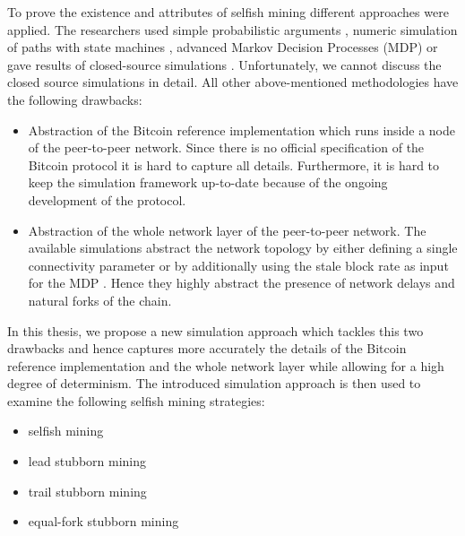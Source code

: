 To prove the existence and attributes of selfish mining different approaches were applied.
The researchers used simple probabilistic arguments \cite{eyal2014majority, bahack2013theoretical}, numeric simulation of paths with state machines \cite{gervais2015tampering, nayak2016stubborn}, advanced Markov Decision Processes (MDP) \cite{sapirshtein2016optimal, gervais2016security} or gave results of closed-source simulations \cite{eyal2014majority, sapirshtein2016optimal}.
Unfortunately, we cannot discuss the closed source simulations in detail.
All other above-mentioned methodologies have the following drawbacks:
\begin{itemize}
\item Abstraction of the Bitcoin reference implementation which runs inside a node of the peer-to-peer network.
Since there is no official specification of the Bitcoin protocol it is hard to capture all details.
Furthermore, it is hard to keep the simulation framework up-to-date because of the ongoing development of the protocol.
\item Abstraction of the whole network layer of the peer-to-peer network.
The available simulations abstract the network topology by either defining a single connectivity parameter \cite{eyal2014majority, bahack2013theoretical, nayak2016stubborn, sapirshtein2016optimal, gervais2015tampering} or by additionally using the stale block rate as input for the MDP \cite{gervais2016security}.
Hence they highly abstract the presence of network delays and natural forks of the chain.
\end{itemize}


In this thesis, we propose a new simulation approach which tackles this two drawbacks and hence captures more accurately the details of the Bitcoin reference implementation and the whole network layer while allowing for a high degree of determinism.
The introduced simulation approach is then used to examine the following selfish mining strategies:

\begin{itemize}
\item selfish mining \cite{eyal2014majority}
\item lead stubborn mining \cite{nayak2016stubborn}
\item trail stubborn mining \cite{nayak2016stubborn}
\item equal-fork stubborn mining \cite{nayak2016stubborn}
\end{itemize}

